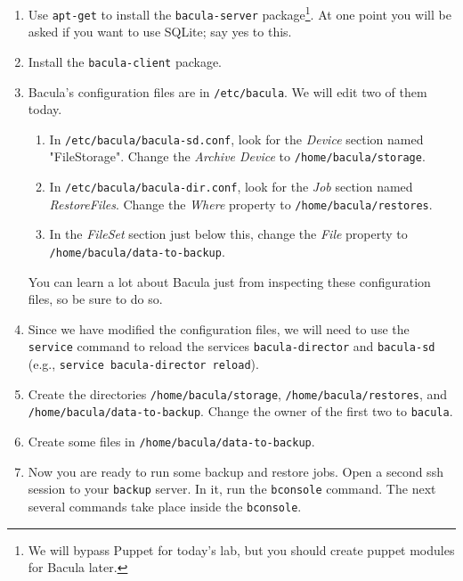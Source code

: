 \documentclass{article}   	%
\begin{document}
\begin{enumerate}
  \item Use \texttt{apt-get} to install the \texttt{bacula-server} package\footnote{We will bypass Puppet for today's lab, but you should create puppet modules for Bacula later.}.  At one point you will be asked if you want to use SQLite; say yes to this.  

  \item Install the \texttt{bacula-client} package.

  \item Bacula's configuration files are in \texttt{/etc/bacula}. We will edit two of them today.
        \begin{enumerate}
            \item In \texttt{/etc/bacula/bacula-sd.conf}, look for the \emph{Device} section named "FileStorage".  Change the \emph{Archive Device} to 
	          \texttt{/home/bacula/storage}.

	    \item In \texttt{/etc/bacula/bacula-dir.conf}, look for the \emph{Job} section named \emph{RestoreFiles}.  Change the \emph{Where} property
	          to \texttt{/home/bacula/restores}.

	    \item In the \emph{FileSet} section just below this, change the \emph{File} property to \texttt{/home/bacula/data-to-backup}.
	\end{enumerate}

	You can learn a lot about Bacula just from inspecting these configuration files, so be sure to do so.

  \item Since we have modified the configuration files, we will need to use the \texttt{service} command to reload the services 
        \texttt{bacula-director} and \texttt{bacula-sd} (e.g., \texttt{service bacula-director reload}).

  \item Create the directories \texttt{/home/bacula/storage}, \texttt{/home/bacula/restores}, and \texttt{/home/bacula/data-to-backup}.
        Change the owner of the first two to \texttt{bacula}.

  \item Create some files in \texttt{/home/bacula/data-to-backup}.

  \item Now you are ready to run some backup and restore jobs.  Open a second ssh session to your \texttt{backup} server. In it, run the 
        \texttt{bconsole} command.  The next several commands take place inside the \texttt{bconsole}.


\end{enumerate}
\end{document}
